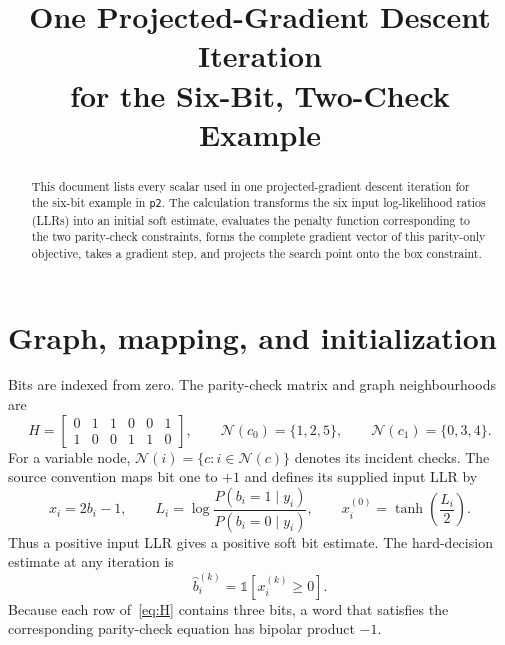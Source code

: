 \documentclass[11pt]{article}
\title{One Projected-Gradient Descent Iteration\\
  for the Six-Bit, Two-Check Example}
\author{}
\date{}
\newcommand{\Ncal}{\mathcal{N}}
\begin{document}
\maketitle
\vspace{-1.6em}

\begin{abstract}
This document lists every scalar used in one projected-gradient descent
iteration for the six-bit example in \texttt{p2}.  The calculation transforms
the six input log-likelihood ratios (LLRs) into an initial soft estimate,
evaluates the penalty function corresponding to the two parity-check
constraints, forms the complete gradient vector of this parity-only objective,
takes a gradient step, and projects the search point onto the box constraint.
\end{abstract}

\noindent
{}

\section{Graph, mapping, and initialization}

Bits are indexed from zero.  The parity-check matrix and graph neighbourhoods
are
\begin{equation}
H=
\begin{bmatrix}
0&1&1&0&0&1\\
1&0&0&1&1&0
\end{bmatrix},
\qquad
\Ncal(c_0)=\{1,2,5\},
\qquad
\Ncal(c_1)=\{0,3,4\}.
\label{eq:H}
\end{equation}
For a variable node, \(\Ncal(i)=\{c:i\in\Ncal(c)\}\) denotes its incident
checks.  The source convention maps bit one to \(+1\) and defines its supplied
input LLR by
\begin{equation}
x_i=2b_i-1,
\qquad
L_i=\log\frac{P(b_i=1\mid y_i)}{P(b_i=0\mid y_i)},
\qquad
x_i^{(0)}=\tanh\!\left(\frac{L_i}{2}\right).
\label{eq:init}
\end{equation}
Thus a positive input LLR gives a positive soft bit estimate.  The
hard-decision estimate at any iteration is
\begin{equation}
\widehat b_i^{(k)}=\mathbb{1}\!\left[x_i^{(k)}\geq0\right].
\label{eq:hard-decision}
\end{equation}
Because each
row of~\eqref{eq:H} contains three bits, a word that satisfies the corresponding
parity-check equation has bipolar product \(-1\).
\end{document}
